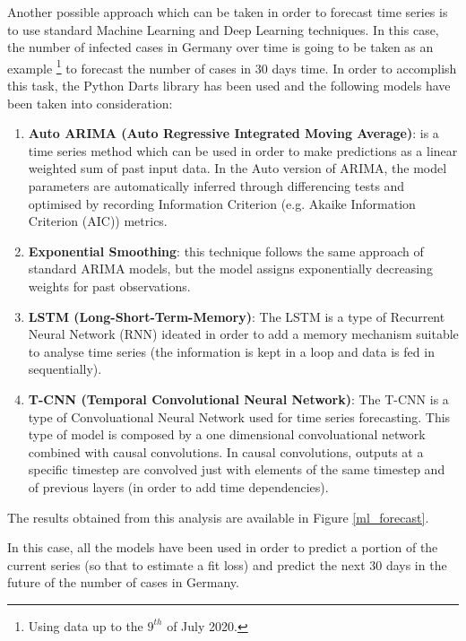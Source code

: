 Another possible approach which can be taken in order to forecast time series is to use standard Machine Learning and Deep Learning techniques. In this case, the number of infected cases in Germany over time is going to be taken as an example \footnote{Using data up to the $9^{th}$ of July 2020.} to forecast the number of cases in 30 days time. In order to accomplish this task, the Python Darts library \cite{darts} has been used and the following models have been taken into consideration:
\vspace{-0.5cm}
\begin{enumerate}
    \item \textbf{Auto ARIMA (Auto Regressive Integrated Moving Average)}: is a time series method which can be used in order to make predictions as a linear weighted sum of past input data. In the Auto version of ARIMA, the model parameters are automatically inferred through differencing tests and optimised by recording Information Criterion (e.g. Akaike Information Criterion (AIC)) metrics.
    \item \textbf{Exponential Smoothing}: this technique follows the same approach of standard ARIMA models, but the model assigns exponentially decreasing weights for past observations.
    \item \textbf{LSTM (Long-Short-Term-Memory)}: The LSTM is a type of Recurrent Neural Network (RNN) ideated in order to add a memory mechanism suitable to analyse time series (the information is kept in a loop and data is fed in sequentially).
    \item \textbf{T-CNN (Temporal Convolutional Neural Network)}: The T-CNN is a type of Convoluational Neural Network used for time series forecasting. This type of model is composed by a one dimensional convoluational network combined with causal convolutions. In causal convolutions, outputs at a specific timestep are convolved just with elements of the same timestep and of previous layers (in order to add time dependencies).
\end{enumerate}
\vspace{-0.3cm}
The results obtained from this analysis are available in Figure \ref{ml_forecast}. 

In this case, all the models have been used in order to predict a portion of the current series (so that to estimate a fit loss) and predict the next 30 days in the future of the number of cases in Germany.

